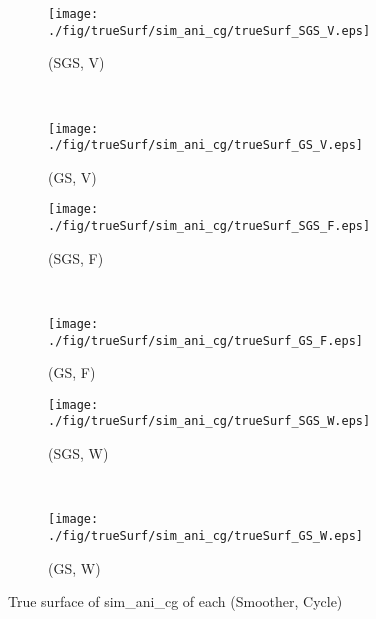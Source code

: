\begin{figure}
  \centering
  \begin{subfigure}[h]{0.45\textwidth}
    \texttt{[image: ./fig/trueSurf/sim\_ani\_cg/trueSurf\_SGS\_V.eps]}
    \caption{(SGS, V)}
  \end{subfigure}
  ~
  \begin{subfigure}[h]{0.45\textwidth}
    \texttt{[image: ./fig/trueSurf/sim\_ani\_cg/trueSurf\_GS\_V.eps]}
    \caption{(GS, V)}
  \end{subfigure}
  
  \begin{subfigure}[h]{0.45\textwidth}
    \texttt{[image: ./fig/trueSurf/sim\_ani\_cg/trueSurf\_SGS\_F.eps]}
    \caption{(SGS, F)}
  \end{subfigure}
  ~
  \begin{subfigure}[h]{0.45\textwidth}
    \texttt{[image: ./fig/trueSurf/sim\_ani\_cg/trueSurf\_GS\_F.eps]}
    \caption{(GS, F)}
  \end{subfigure}
  
  \begin{subfigure}[h]{0.45\textwidth}
    \texttt{[image: ./fig/trueSurf/sim\_ani\_cg/trueSurf\_SGS\_W.eps]}
    \caption{(SGS, W)}
  \end{subfigure}
  ~
  \begin{subfigure}[h]{0.45\textwidth}
    \texttt{[image: ./fig/trueSurf/sim\_ani\_cg/trueSurf\_GS\_W.eps]}
    \caption{(GS, W)}
  \end{subfigure}
  \caption{True surface of sim\_ani\_cg of each (Smoother, Cycle)}\label{fig:trueSurf_sim_ani_cg}
\end{figure}

